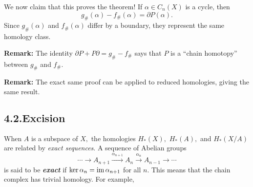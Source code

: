 \documentclass{article}
\begin{document}
We now claim that this proves the theorem! If $\alpha \in C_n(X)$ is a cycle, then%
\noindent\noindent\[%
g_\#(\alpha) - f_\#(\alpha) = \partial P(\alpha).
\]%
\noindent{}Since $g_\#(\alpha)$ and $f_\#(\alpha)$ differ by a boundary, they represent the same homology class.

\textbf{Remark:} The identity $\partial P + P \partial = g_\# - f_\#$ says that $P$ is a \textquotedblleft{}chain homotopy\textquotedblright{} between $g_\#$ and $f_\#.$%

\textbf{Remark:} The exact same proof can be applied to reduced homologies, giving the same result.%

\subsection{4.2.\hspace*{0.5em}Excision}\label{sec-excision}%

\noindent{}When $A$ is a subspace of $X,$ the homologies $H_*(X),$ $H_*(A),$ and $H_*(X/A)$ are related by \emph{exact sequences}. A sequence of Abelian groups%
\noindent\noindent\[%
\cdots \longrightarrow A_{n+1}
\overset{\alpha_{n+1}}{\longrightarrow} A_n
\overset{\alpha_{n}}{\longrightarrow} A_{n-1}
\longrightarrow \cdots
\]%
\noindent{}is said to be \textbf{\emph{exact}} if $\ker\alpha_n = \operatorname{im}\alpha_{n+1}$ for all $n.$ This means that the chain complex has trivial homology. For example,
\end{document}
